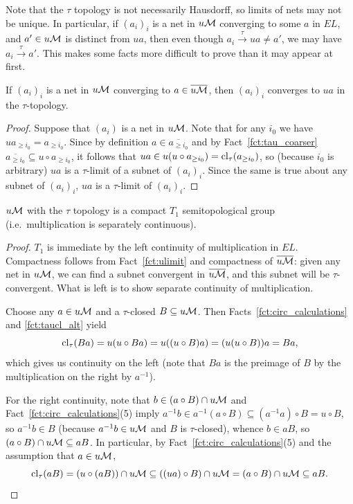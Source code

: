	\begin{rem}
		Note that the $\tau$ topology is not necessarily Hausdorff, so limits of nets may not be unique. In particular, if $(a_i)_i$ is a net in $u{\mathcal M}$ converging to some $a$ in $EL$, and $a'\in u{\mathcal M}$ is distinct from $ua$, then even though $a_i\xrightarrow{\tau} ua\neq a'$, we may have $a_i\xrightarrow{\tau} a'$. This makes some facts more difficult to prove than it may appear at first.
		\xqed{\lozenge}
	\end{rem}
	
	\begin{fct}
		\label{fct:ulimit}
		If $(a_i)_i$ is a net in $u{\mathcal M}$ converging to $a\in \overline{u{\mathcal M}}$, then $(a_i)_i$ converges to $ua$ in the $\tau$-topology.
	\end{fct}
	\begin{proof}
		Suppose that $(a_i)$ is a net in $u{\mathcal M}$. Note that for any $i_0$ we have $ua_{\geq i_0}=a_{\geq i_0}$. Since by definition $a\in \overline {a_{\geq i_0}}$ and by Fact~\ref{fct:tau_coarser} $\overline {a_{\geq i_0}}\subseteq u\circ a_{\geq i_0}$, it follows that $ua\in u(u\circ a_{\geq i_0})=\operatorname{{cl}}_{\tau}(a_{\geq i_0})$, so (because $i_0$ is arbitrary) $ua$ is a $\tau$-limit of a subnet of $(a_i)_i$. Since the same is true about any subnet of $(a_i)_i$, $ua$ is a $\tau$-limit of $(a_i)_i$.
	\end{proof}
	
	
	
	\begin{fct}
		\label{fct:tau_T1}
		$u{\mathcal M}$ with the $\tau$ topology is a compact $T_1$ semitopological group (i.e.\ multiplication is separately continuous).
	\end{fct}
	\begin{proof}
		$T_1$ is immediate by the left continuity of multiplication in $EL$. Compactness follows from Fact~\ref{fct:ulimit} and compactness of $\overline{u{\mathcal M}}$: given any net in $u{\mathcal M}$, we can find a subnet convergent in $\overline{u{\mathcal M}}$, and this subnet will be $\tau$-convergent. What is left is to show separate continuity of multiplication.
		
		Choose any $a\in u{\mathcal M}$ and a $\tau$-closed $B\subseteq u{\mathcal M}$. Then Facts~\ref{fct:circ_calculations} and \ref{fct:taucl_alt} yield
		\[
		\operatorname{{cl}}_\tau (Ba)= u(u\circ Ba)=u((u\circ B)a)=(u(u\circ B))a=Ba,
		\]
		which gives us continuity on the left (note that $Ba$ is the preimage of $B$ by the multiplication on the right by $a^{-1}$).
		
		For the right continuity, note that $b\in (a\circ B)\cap u{\mathcal M}$ and Fact~\ref{fct:circ_calculations}(5) imply $a^{-1}b\in a^{-1}(a\circ B)\subseteq (a^{-1}a)\circ B=u\circ B$, so $a^{-1}b\in B$ (because $a^{-1}b\in u{\mathcal M}$ and $B$ is $\tau$-closed), whence $b\in aB$, so $(a\circ B)\cap u{\mathcal M}\subseteq aB$. In particular, by Fact~\ref{fct:circ_calculations}(5) and the assumption that $a\in u{\mathcal M}$,
		\[
		\operatorname{{cl}}_\tau (aB)=(u\circ(aB))\cap u{\mathcal M}\subseteq ((ua)\circ B)\cap u{\mathcal M}=(a\circ B)\cap u{\mathcal M}\subseteq aB.\qedhere
		\]
	\end{proof}
	
